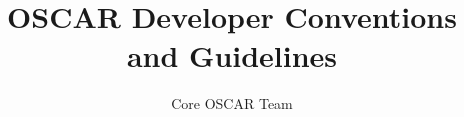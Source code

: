 %
%
%

\title{OSCAR Developer Conventions and Guidelines}
\author{Core OSCAR Team}
\maketitle
\newpage
